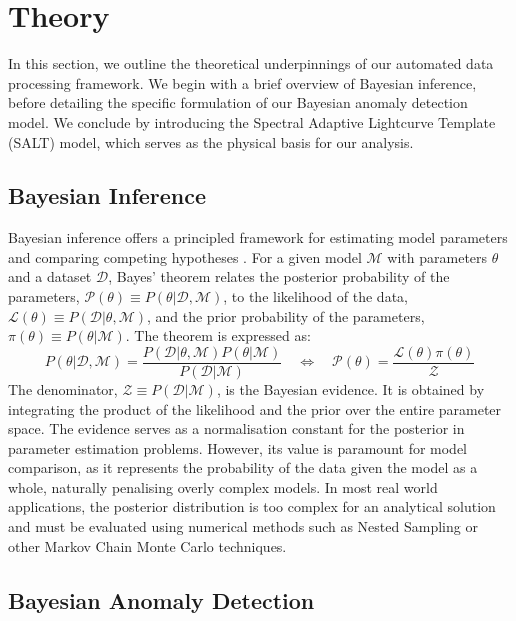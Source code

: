 \section{Theory}
\label{sec:theory}

In this section, we outline the theoretical underpinnings of our automated data processing framework. We begin with a brief overview of Bayesian inference, before detailing the specific formulation of our Bayesian anomaly detection model. We conclude by introducing the Spectral Adaptive Lightcurve Template (SALT) model, which serves as the physical basis for our analysis.

\subsection{Bayesian Inference}

Bayesian inference offers a principled framework for estimating model parameters
and comparing competing hypotheses \citep{MacKay2003}. For a given model $\mathcal{M}$ with
parameters $\theta$ and a dataset $\mathcal{D}$, Bayes' theorem relates the
posterior probability of the parameters, $\mathcal{P}(\theta) \equiv P(\theta
| \mathcal{D}, \mathcal{M})$, to the likelihood of the data,
$\mathcal{L}(\theta) \equiv P(\mathcal{D} | \theta, \mathcal{M})$, and the prior
probability of the parameters, $\pi(\theta) \equiv P(\theta | \mathcal{M})$. The
theorem is expressed as: \begin{equation} P(\theta | \mathcal{D}, \mathcal{M})
= \frac{P(\mathcal{D} | \theta, \mathcal{M}) P(\theta
| \mathcal{M})}{P(\mathcal{D} | \mathcal{M})} \quad \iff \quad
\mathcal{P}(\theta) = \frac{\mathcal{L}(\theta) \pi(\theta)}{\mathcal{Z}}
\end{equation} The denominator, $\mathcal{Z} \equiv P(\mathcal{D}
| \mathcal{M})$, is the Bayesian evidence. It is obtained by integrating the
product of the likelihood and the prior over the entire parameter space. The
evidence serves as a normalisation constant for the posterior in parameter
estimation problems. However, its value is paramount for model comparison, as it
represents the probability of the data given the model as a whole, naturally
penalising overly complex models. In most real world applications, the posterior
distribution is too complex for an analytical solution and must be evaluated
using numerical methods such as Nested Sampling \citep{Skilling2006, buchner2023nested, ashton2022nested} or other Markov Chain Monte Carlo techniques.

\subsection{Bayesian Anomaly Detection}
\label{subsec:anomaly_detection}

